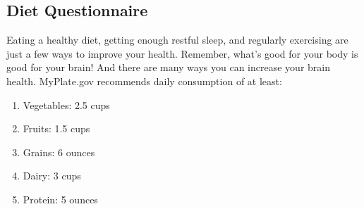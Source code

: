 \subsection{Diet Questionnaire}

Eating a healthy diet, getting enough restful sleep, and regularly exercising are just a few ways to improve your health. Remember, what’s good for your body is good for your brain! And there are many ways you can increase your brain health. MyPlate.gov recommends daily consumption of at least:

\begin{enumerate}
    \item Vegetables: 2.5 cups
    \item Fruits: 1.5 cups
    \item Grains: 6 ounces
    \item Dairy: 3 cups
    \item Protein: 5 ounces
\end{enumerate}
